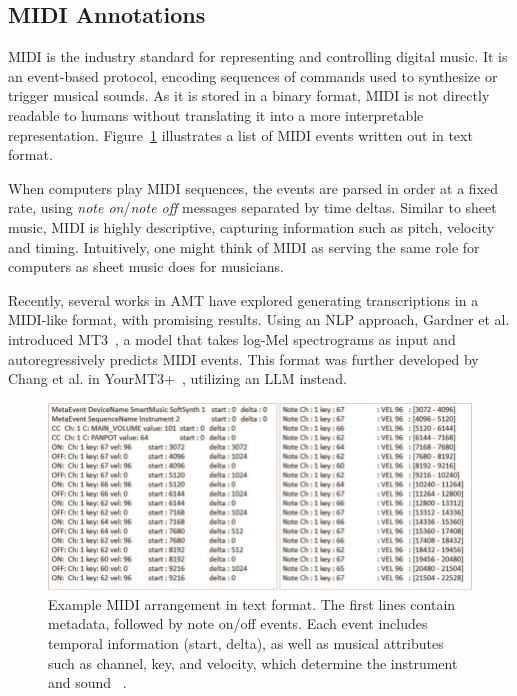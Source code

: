 \subsection{MIDI Annotations}

\gls{MIDI} is the industry standard for representing and controlling digital music. It is an event-based protocol, encoding sequences of commands used to synthesize or trigger musical sounds. As it is stored in a binary format, \gls{MIDI} is not directly readable to humans without translating it into a more interpretable representation. Figure~\ref{MIDIFigure} illustrates a list of MIDI events written out in text format.

When computers play \gls{MIDI} sequences, the events are parsed in order at a fixed rate, using \textit{note on}/\textit{note off} messages separated by time deltas. Similar to sheet music, \gls{MIDI} is highly descriptive, capturing information such as pitch, velocity and timing. Intuitively, one might think of \gls{MIDI} as serving the same role for computers as sheet music does for musicians.

Recently, several works in \gls{AMT} have explored generating transcriptions in a \gls{MIDI}-like format, with promising results. Using an \acrshort{NLP} approach, Gardner et al. introduced MT3~\cite{gardner2022mt3multitaskmultitrackmusic}, a model that takes log-Mel spectrograms as input and autoregressively predicts \gls{MIDI} events. This format was further developed by Chang et al. in YourMT3+~\cite{chang2024yourmt3+}, utilizing an \acrshort{LLM} instead.

\begin{figure}[H]
    \centering
    \includegraphics[scale=0.65, trim={0 0 13.8cm 0},clip]{figures/midi}
    \caption{Example MIDI arrangement in text format. The first lines contain metadata, followed by note on/off events. Each event includes temporal information (start, delta), as well as musical attributes such as channel, key, and velocity, which determine the instrument and sound ~\cite{starostenko2019}.}
    \label{MIDIFigure}
\end{figure}

